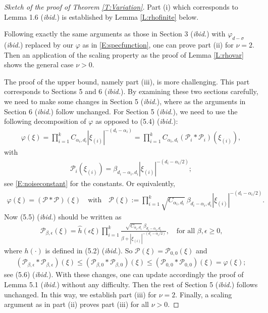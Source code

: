\documentclass[12pt]{report}
\theoremstyle{plain}
\theoremstyle{definition}
\numberwithin{equation}{section}
\begin{document}
\begin{proof}[Sketch of the proof of Theorem \ref{T:Variation}]
	Part (i) which corresponds to Lemma 1.6 ({\it ibid.}) is established by Lemma \ref{L:rhofinite}
	below.
	
	Following exactly the same arguments as those in Section 3 ({\it ibid.}) with $\varphi_{d-\sigma}$
	({\it ibid.}) replaced by our $\varphi$ as in \eqref{E:specfunction}, one can prove part (ii) for
	$\nu=2$. Then an application of the scaling property as the proof of Lemma \ref{L:rhovar} shows
	the general case $\nu >0$.
	
	The proof of the upper bound, namely part (iii), is more challenging. This part corresponds to
	Sections 5 and 6 ({\it ibid.}). By examining these two sections carefully, we need to make some
	changes in Section 5 ({\it ibid.}), where as the arguments in Section 6 ({\it ibid.}) follow
	unchanged. For Section 5 ({\it ibid.}), we need to use the following decomposition of $\varphi$ as
	opposed to (5.4) ({\it ibid.}):
	\begin{align*}
	\varphi(\xi) = \prod_{i=1}^k C_{\alpha_i,d_i} |\xi_{(i)}|^{-(d_i-\alpha_i)}
	= \prod_{i=1}^k C_{\alpha_i,d_i} (\mathcal{P}_i*\mathcal{P}_i) \left(\xi_{(i)}\right),
	\end{align*}
	with
	\begin{align*}
	\mathcal{P}_i\left(\xi_{(i)}\right)=\beta_{d_i-\alpha_i,d_i}\left|\xi_{(i)}\right|^{-(d_i-\alpha_i / 2)};
	\end{align*}
	see \eqref{E:noiseconstant} for the constants. Or equivalently,
	\begin{align*}
	\varphi(\xi)      = \left(\mathcal{P} * \mathcal{P}\right)(\xi) \quad \text{with} \quad
	\mathcal{P}(\xi) := \prod_{i=1 }^{k} \sqrt{C_{\alpha_i,d_i}}\: \beta_{d_i-\alpha_i,d_i} \left|\xi_{(i)}\right|^{-(d_i-\alpha_i / 2)}.
	\end{align*}
	Now (5.5) ({\it ibid.}) should be written as
	\begin{align*}
	\mathcal{P}_{\beta,\epsilon}(\xi)
	= \hat{h}(\epsilon \xi) \prod_{i=1 }^{k} \frac{\sqrt{C_{\alpha_i,d_i}}\: \beta_{d_i-\alpha_i,d_i} }{\beta+\left|\xi_{(i)}\right|^{-(d_i-\alpha_i / 2)}},
	\quad \text{for all $\beta,\epsilon \ge 0$,}
	\end{align*}
	where $h(\cdot)$ is defined in (5.2) ({\it ibid.}).  So $\mathcal{P}(\xi) =
	\mathcal{P}_{0,0}(\xi)$ and
	\begin{align*}
	\left(\mathcal{P}_{\beta,\epsilon}*\mathcal{P}_{\beta,\epsilon}\right)(\xi) \le
	\left(\mathcal{P}_{\beta,0}*\mathcal{P}_{\beta,0}\right)(\xi) \le
	\left(\mathcal{P}_{0,0}*\mathcal{P}_{0,0}\right)(\xi) = \varphi(\xi);
	\end{align*}
	see (5.6) ({\it ibid.}). With these changes, one can update accordingly the proof of Lemma 5.1
	({\it ibid.}) without any difficulty. Then the rest of Section 5 ({\it ibid.}) follows unchanged.
	In this way, we establish part (iii) for $\nu=2$. Finally, a scaling argument as in part (ii)
	proves part (iii) for all $\nu>0$.
	

\end{proof}
\end{document}
